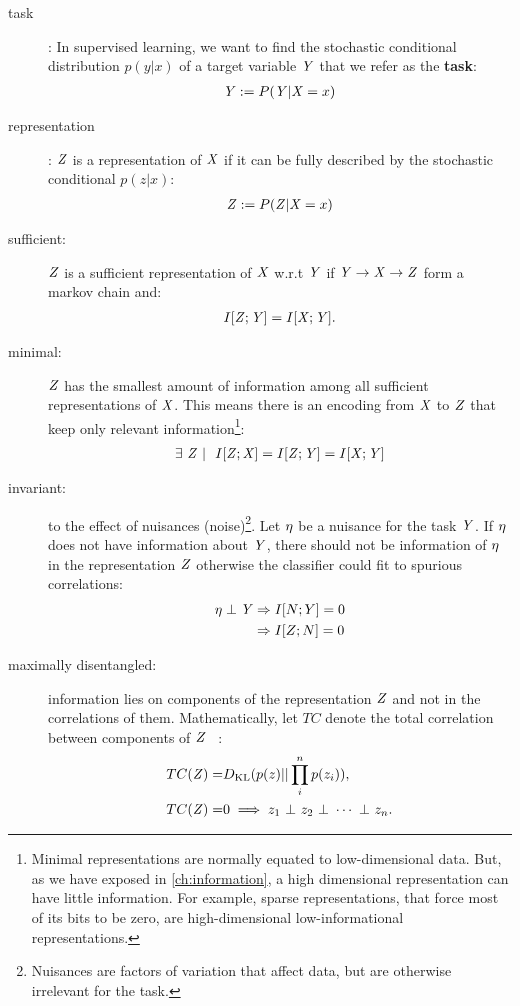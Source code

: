 \begin{description}
    \item [task]: In supervised learning, we want to find the stochastic conditional distribution \textbf{$p(y|x)$} of a target variable ${\mathit{Y}}$ that we refer as the \textbf{task}:
    \begin{align*}
        {\mathit{Y}} := P({\mathit{Y}}|{\mathit{X}}=x)
    \end{align*}
    \item [representation]: ${\mathit{Z}}$ is a representation of ${\mathit{X}}$ if it can be fully described by the stochastic conditional $p(z|x)$:
    \begin{align*}
        {\mathit{Z}} := P({\mathit{Z}}|{\mathit{X}}=x)
    \end{align*}
  \item[sufficient:] ${\mathit{Z}}$ is a sufficient representation of ${\mathit{X}}$ w.r.t ${\mathit{Y}}$ if ${\mathit{Y}} \to {\mathit{X}} \to {\mathit{Z}}$ form a markov chain and:
    \begin{align*}
        I[{{\mathit{Z}}};{{\mathit{Y}}}]=I[{{\mathit{X}}};{{\mathit{Y}}}].
    \end{align*}
    \item[minimal:] ${\mathit{Z}}$ has the smallest amount of information among all sufficient representations of ${\mathit{X}}$.  This means there is an encoding from ${\mathit{X}}$ to ${\mathit{Z}}$ that keep only relevant information\footnote{Minimal representations are normally equated to low-dimensional data. But, as we have exposed in \cref{ch:information}, a high dimensional representation can have little information. For example, sparse representations, that force most of its bits to be zero, are high-dimensional low-informational representations.}:
  \begin{align}
      \exists ~{\mathit{Z}}~ | ~~ I[{{\mathit{Z}}};{{\mathit{X}}}] = I[{{\mathit{Z}}};{{\mathit{Y}}}] = I[{{\mathit{X}}};{{\mathit{Y}}}]
  \end{align}
  \item[invariant:]
to the effect of nuisances (noise)\footnote{Nuisances are factors of variation that affect data, but are otherwise irrelevant for the task.}. Let ${\mathit{\eta}}$ be a nuisance for the task ${\mathit{Y}}$. If ${\mathit{\eta}}$ does not have information about ${\mathit{Y}}$, there should not be information of ${\mathit{\eta}}$ in the representation ${\mathit{Z}}$ otherwise the classifier could fit to spurious correlations:\begin{align}
    {\mathit{\eta}}\perp {\mathit{Y}} &\Rightarrow I[N;Y]=0 \nonumber\\
    &\Rightarrow I[Z;N]=0
  \end{align}
  \item[maximally disentangled:] information lies on components of the representation ${\mathit{Z}}$ and not in the correlations of them. Mathematically, let $TC$ denote the total correlation between components of ${\mathit{Z}}$~\cite{achille:2017emergence} :
  \begin{align}
    TC({\mathit{Z}})=& D_{\mathrm{KL}}(p(z)||\prod_i^n p(z_i)),\\
    TC({\mathit{Z}})=& 0 \implies z_1 ~\bot~ z_2 ~\bot~ \cdots ~\bot~ z_n.
  \end{align}
\end{description}

